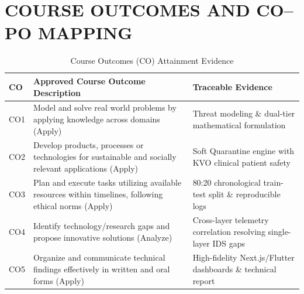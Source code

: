 \documentclass[12pt,a4paper]{report}
\begin{document}
\chapter{COURSE OUTCOMES AND CO--PO MAPPING}
\begin{table}[h]
\centering
\caption{Course Outcomes (CO) Attainment Evidence}
\label{tab:app_b}
\vspace{0.3cm}
\begin{tabular}{|l|p{9.5cm}|l|}
\hline
\textbf{CO} & \textbf{Approved Course Outcome Description} & \textbf{Traceable Evidence} \\
\hline
CO1 & Model and solve real world problems by applying knowledge across domains (Apply) & Threat modeling \& dual-tier mathematical formulation \\
CO2 & Develop products, processes or technologies for sustainable and socially relevant applications (Apply) & Soft Quarantine engine with KVO clinical patient safety \\
CO3 & Plan and execute tasks utilizing available resources within timelines, following ethical norms (Apply) & 80:20 chronological train-test split \& reproducible logs \\
CO4 & Identify technology/research gaps and propose innovative solutions (Analyze) & Cross-layer telemetry correlation resolving single-layer IDS gaps \\
CO5 & Organize and communicate technical findings effectively in written and oral forms (Apply) & High-fidelity Next.js/Flutter dashboards \& technical report \\
\hline
\end{tabular}
\end{table}
\end{document}

